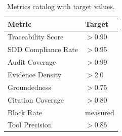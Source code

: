 \begin{table}[ht]
\centering
\caption{Metrics catalog with target values.}
\label{tab:metrics-catalog}
\begin{tabular}{ll}
\toprule
\textbf{Metric} & \textbf{Target} \\
\midrule
Traceability Score & $> 0.90$ \\
SDD Compliance Rate & $> 0.95$ \\
Audit Coverage & $> 0.99$ \\
Evidence Density & $> 2.0$ \\
Groundedness & $> 0.75$ \\
Citation Coverage & $> 0.80$ \\
Block Rate & measured \\
Tool Precision & $> 0.85$ \\
\bottomrule
\end{tabular}
\end{table}

